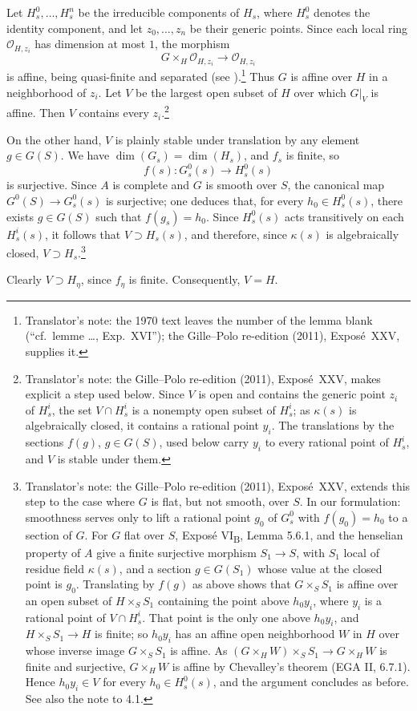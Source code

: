 
Let \(H_s^0,\ldots,H_s^n\) be the irreducible components of \(H_s\),
where \(H_s^0\) denotes the identity component, and let
\(z_0,\ldots,z_n\) be their generic points. Since each local ring
\(\mathcal O_{H,z_i}\) has dimension at most \(1\), the morphism
\[
 G\times_H\mathcal O_{H,z_i}\longrightarrow\mathcal O_{H,z_i}
\]
is affine, being quasi-finite and separated (see ).\footnote{Translator's note: the
1970 text leaves the number of the lemma blank (``cf.\ lemme \ldots,
Exp.~XVI''); the Gille--Polo re-edition (2011), Exposé~XXV, supplies it.}
Thus \(G\) is affine over \(H\) in a neighborhood of \(z_i\). Let \(V\)
be the largest open subset of \(H\) over which \(G|_V\) is affine.
Then \(V\) contains every \(z_i\).\footnote{Translator's note: the Gille--Polo re-edition (2011), Exposé~XXV, makes
explicit a step used below. Since \(V\) is open and contains the generic point
\(z_i\) of \(H_s^i\), the set \(V\cap H_s^i\) is a nonempty open subset of
\(H_s^i\); as \(\kappa(s)\) is algebraically closed, it contains a rational
point \(y_i\). The translations by the sections \(f(g)\), \(g\in G(S)\), used
below carry \(y_i\) to every rational point of \(H_s^i\), and \(V\) is stable
under them.}

On the other hand, \(V\) is plainly stable under translation by any
element \(g\in G(S)\). We have \(\dim(G_s)=\dim(H_s)\), and \(f_s\) is
finite, so
\[
 f(s)\colon G_s^0(s)\longrightarrow H_s^0(s)
\]
is surjective. Since \(A\) is complete and \(G\) is smooth over \(S\),
the canonical map \(G^0(S)\to G_s^0(s)\) is surjective; one deduces that,
for every \(h_0\in H_s^0(s)\), there exists \(g\in G(S)\) such that
\(f(g_s)=h_0\). Since
\(H_s^0(s)\) acts transitively on each \(H_s^i(s)\), it follows that
\(V\supset H_s(s)\), and therefore, since \(\kappa(s)\) is algebraically
closed, \(V\supset H_s\).\footnote{Translator's note: the Gille--Polo re-edition (2011), Exposé~XXV, extends this
step to the case where \(G\) is flat, but not smooth, over \(S\). In our
formulation: smoothness serves only to lift a rational point \(g_0\) of
\(G_s^0\) with \(f(g_0)=h_0\) to a section of \(G\). For \(G\) flat over \(S\),
Exposé VI\textsubscript{B}, Lemma 5.6.1, and the henselian property of \(A\)
give a finite surjective morphism \(S_1\to S\), with \(S_1\) local of residue
field \(\kappa(s)\), and a section \(g\in G(S_1)\) whose value at the closed
point is \(g_0\). Translating by \(f(g)\) as above shows that
\(G\times_SS_1\) is affine over an open subset of \(H\times_SS_1\) containing
the point above \(h_0y_i\), where \(y_i\) is a rational point of
\(V\cap H_s^i\). That point is the only one above \(h_0y_i\), and
\(H\times_SS_1\to H\) is finite; so \(h_0y_i\) has an affine open
neighborhood \(W\) in \(H\) over whose inverse image \(G\times_SS_1\) is
affine. As \((G\times_HW)\times_SS_1\to G\times_HW\) is finite and
surjective, \(G\times_HW\) is affine by Chevalley's theorem (EGA II, 6.7.1).
Hence \(h_0y_i\in V\) for every \(h_0\in H_s^0(s)\), and the argument
concludes as before. See also the note to 4.1.}

Clearly \(V\supset H_\eta\), since \(f_\eta\) is finite. Consequently,
\(V=H\). \SGAQED
